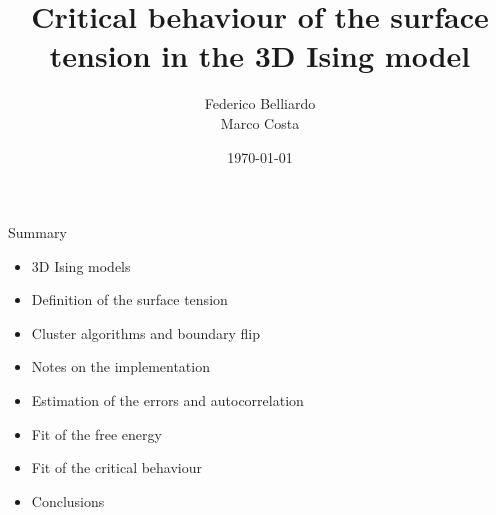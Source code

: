 \documentclass[12pt,handout]{beamer}
\title[]{Critical behaviour of the surface tension in the 3D Ising model} %
\author[]
{
Federico Belliardo \\
Marco Costa
}
\institute[] %
{
Dipartimento di Fisica\\ %
Università di Pisa \\
\medskip
}
\date{\today} %
\begin{document}
\begin{frame}
\titlepage %
\end{frame}



\begin{frame}{Summary}

\begin{center}

\begin{itemize}
\item 3D Ising models
\item Definition of the surface tension
\item Cluster algorithms and boundary flip
\item Notes on the implementation
\item Estimation of the errors and autocorrelation
\item Fit of the free energy
\item Fit of the critical behaviour
\item Conclusions
\end{itemize}

\end{center}
\end{frame}
\end{document}
